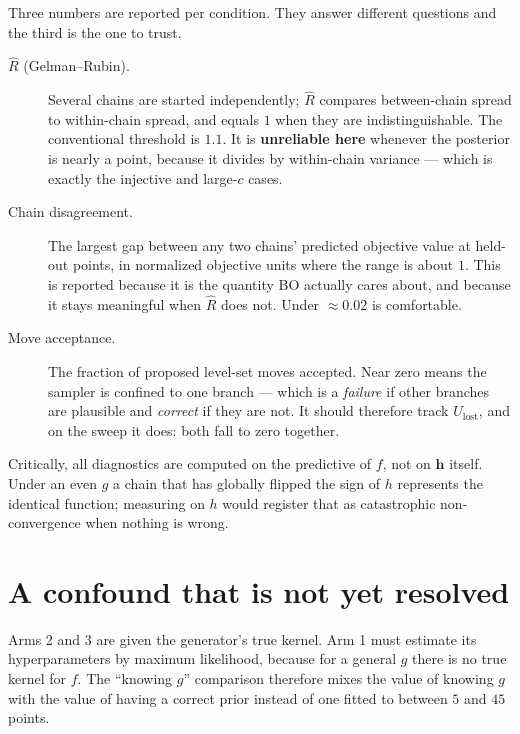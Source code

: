 \documentclass[11pt]{article}
\newcommand{\Ulost}{U_{\text{lost}}}
\begin{document}
Three numbers are reported per condition. They answer different questions and
the third is the one to trust.

\begin{description}
\item[$\hat R$ (Gelman--Rubin).] Several chains are started independently;
$\hat R$ compares between-chain spread to within-chain spread, and equals $1$
when they are indistinguishable. The conventional threshold is $1.1$. It is
\textbf{unreliable here} whenever the posterior is nearly a point, because it
divides by within-chain variance --- which is exactly the injective and
large-$c$ cases.

\item[Chain disagreement.] The largest gap between any two chains' predicted
objective value at held-out points, in normalized objective units where the
range is about $1$. This is reported because it is the quantity BO actually
cares about, and because it stays meaningful when $\hat R$ does not. Under
$\approx0.02$ is comfortable.

\item[Move acceptance.] The fraction of proposed level-set moves accepted. Near
zero means the sampler is confined to one branch --- which is a \emph{failure} if
other branches are plausible and \emph{correct} if they are not. It should
therefore track $\Ulost$, and on the sweep it does: both fall to zero together.
\end{description}

Critically, all diagnostics are computed on the predictive of $f$, not on
$\mathbf{h}$ itself. Under an even $g$ a chain that has globally flipped the sign
of $h$ represents the identical function; measuring on $h$ would register that as
catastrophic non-convergence when nothing is wrong.

\section{A confound that is not yet resolved}
\label{sec:hyperconfound}

Arms 2 and 3 are given the generator's true kernel. Arm 1 must estimate its
hyperparameters by maximum likelihood, because for a general $g$ there is no
true kernel for $f$. The ``knowing $g$'' comparison therefore mixes the value of
knowing $g$ with the value of having a correct prior instead of one fitted to
between $5$ and $45$ points.
\end{document}
